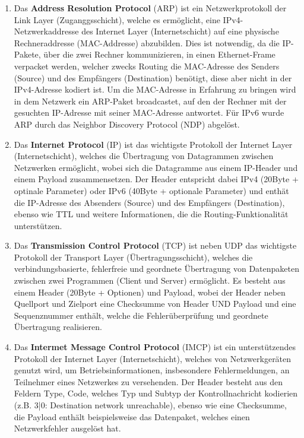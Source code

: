 \documentclass[numbers=noendperiod]{scrartcl}
\begin{document}
\begin{enumerate}
	\item Das \textbf{Address Resolution Protocol} (ARP) ist ein Netzwerkprotokoll der Link Layer (Zuganggsschicht), welche es ermöglicht, eine IPv4-Netzwerkaddresse des Internet Layer (Internetschicht) auf eine physische Rechneraddresse (MAC-Addresse) abzubilden. Dies ist notwendig, da die IP-Pakete, über die zwei Rechner kommunizieren, in einen Ethernet-Frame verpacket werden, welcher zwecks Routing die MAC-Adresse des Senders (Source) und des Empfängers (Destination) benötigt, diese aber nicht in der IPv4-Adresse kodiert ist. Um die MAC-Adresse in Erfahrung zu bringen wird in dem Netzwerk ein ARP-Paket broadcastet, auf den der Rechner mit der gesuchten IP-Adresse mit seiner MAC-Adresse antwortet. Für IPv6 wurde ARP durch das Neighbor Discovery Protocol (NDP) abgelöst.
	
	\item Das \textbf{Internet Protocol} (IP) ist das wichtigste Protokoll der Internet Layer (Internetschicht), welches die Übertragung von Datagrammen zwischen Netzwerken ermöglicht, wobei sich die Datagramme aus einem IP-Header und einem Payload zusammensetzen. Der Header entspricht dabei IPv4 (20Byte + optinale Parameter) oder IPv6 (40Byte + optionale Parameter) und enthät die IP-Adresse des Absenders (Source) und des Empfängers (Destination), ebenso wie TTL und weitere Informationen, die die Routing-Funktionalität unterstützen.
	
	\item Das \textbf{Transmission Control Protocol} (TCP) ist neben UDP das wichtigste Protokoll der Transport Layer (Übertragungsschicht), welches die verbindungsbasierte, fehlerfreie und geordnete Übertragung von Datenpaketen zwischen zwei Programmen (Client und Server) ermöglicht. Es besteht aus einem Header (20Byte + Optionen) und Payload, wobei der Header neben Quellport und Zielport eine Checksumme von Header UND Payload und eine Sequenznummer enthält, welche die Fehlerüberprüfung und geordnete Übertragung realisieren.
	
	\item Das \textbf{Intermet Message Control Protocol} (IMCP) ist ein unterstützendes Protokoll der Internet Layer (Internetschicht), welches von Netzwerkgeräten genutzt wird, um Betriebsinformationen, insbesondere Fehlermeldungen, an Teilnehmer eines Netzwerkes zu versehenden. Der Header besteht aus den Feldern Type, Code, welches Typ und Subtyp der Kontrollnachricht kodierien (z.B. 3|0: Destination network unreachable), ebenso wie eine Checksumme, die Payload enthält beispielsweise das Datenpaket, welches einen Netzwerkfehler ausgelöst hat.
	

\end{enumerate}
\end{document}

